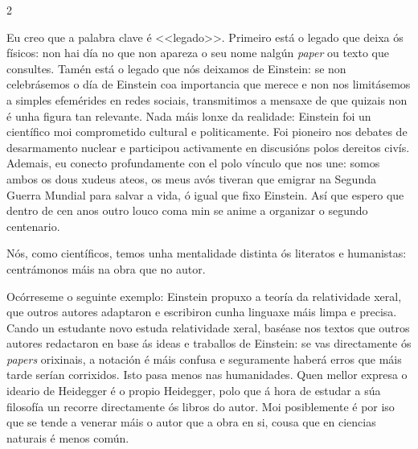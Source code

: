 \begin{multicols}{2}
\textcolor{Resalte}{\hrulefill}


Eu creo que a palabra clave é <<legado>>. Primeiro está o legado que
deixa ós físicos: non hai día no que non apareza o seu nome nalgún \emph{paper}
ou texto que consultes. Tamén está o legado que nós deixamos de Einstein: se
non celebrásemos o día de Einstein coa importancia que merece e non nos
limitásemos a simples efemérides en redes sociais, transmitimos a mensaxe de
que quizais non é unha figura tan relevante. Nada máis lonxe da realidade:
Einstein foi un científico moi comprometido cultural e politicamente.
Foi pioneiro nos debates de desarmamento nuclear e participou activamente en
discusións polos dereitos civís. Ademais, eu conecto profundamente con
el polo vínculo que nos une: somos ambos os dous xudeus ateos, os meus avós
tiveran que emigrar na Segunda Guerra Mundial para salvar a vida, ó igual que
fixo Einstein. Así que espero que dentro de cen anos outro louco coma min se
anime a organizar o segundo centenario.



Nós, como científicos, temos unha mentalidade distinta ós literatos e
humanistas: centrámonos máis na obra que no autor.


Ocórreseme o seguinte exemplo: Einstein propuxo a teoría da relatividade xeral,
que outros autores adaptaron e escribiron cunha linguaxe máis limpa e precisa.
Cando un estudante novo estuda relatividade xeral, baséase nos textos que
outros autores redactaron en base ás ideas e traballos de Einstein: se vas
directamente ós \textit{papers} orixinais, a notación é máis confusa e
seguramente haberá erros que máis tarde serían corrixidos. Isto pasa menos nas
humanidades. Quen mellor expresa o ideario de Heidegger é o propio Heidegger,
polo que á hora de estudar a súa filosofía un recorre directamente ós libros do
autor. Moi posiblemente é por iso que se tende a venerar máis o autor que a
obra en si, cousa que en ciencias naturais é menos común.


\end{multicols}
